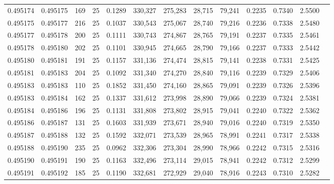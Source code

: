 \begin{tabular}{rrrrrrrrrrrrr}
0.495174 & 0.495175 &   169 &  25 &                                     0.1289 & 330,327 & 275,283 &  28,715 &  79,241 & 0.2235 & 0.7340 & 2.5500 \\
0.495175 & 0.495177 &   216 &  25 &                                     0.1037 & 330,543 & 275,067 &  28,740 &  79,216 & 0.2236 & 0.7338 & 2.5480 \\
0.495177 & 0.495178 &   200 &  25 &                                     0.1111 & 330,743 & 274,867 &  28,765 &  79,191 & 0.2237 & 0.7335 & 2.5461 \\
0.495178 & 0.495180 &   202 &  25 &                                     0.1101 & 330,945 & 274,665 &  28,790 &  79,166 & 0.2237 & 0.7333 & 2.5442 \\
0.495180 & 0.495181 &   191 &  25 &                                     0.1157 & 331,136 & 274,474 &  28,815 &  79,141 & 0.2238 & 0.7331 & 2.5425 \\
0.495181 & 0.495183 &   204 &  25 &                                     0.1092 & 331,340 & 274,270 &  28,840 &  79,116 & 0.2239 & 0.7329 & 2.5406 \\
0.495183 & 0.495183 &   110 &  25 &                                     0.1852 & 331,450 & 274,160 &  28,865 &  79,091 & 0.2239 & 0.7326 & 2.5396 \\
0.495183 & 0.495184 &   162 &  25 &                                     0.1337 & 331,612 & 273,998 &  28,890 &  79,066 & 0.2239 & 0.7324 & 2.5381 \\
0.495184 & 0.495186 &   196 &  25 &                                     0.1131 & 331,808 & 273,802 &  28,915 &  79,041 & 0.2240 & 0.7322 & 2.5362 \\
0.495186 & 0.495187 &   131 &  25 &                                     0.1603 & 331,939 & 273,671 &  28,940 &  79,016 & 0.2240 & 0.7319 & 2.5350 \\
0.495187 & 0.495188 &   132 &  25 &                                     0.1592 & 332,071 & 273,539 &  28,965 &  78,991 & 0.2241 & 0.7317 & 2.5338 \\
0.495188 & 0.495190 &   235 &  25 &                                     0.0962 & 332,306 & 273,304 &  28,990 &  78,966 & 0.2242 & 0.7315 & 2.5316 \\
0.495190 & 0.495191 &   190 &  25 &                                     0.1163 & 332,496 & 273,114 &  29,015 &  78,941 & 0.2242 & 0.7312 & 2.5299 \\
0.495191 & 0.495192 &   185 &  25 &                                     0.1190 & 332,681 & 272,929 &  29,040 &  78,916 & 0.2243 & 0.7310 & 2.5282 \\

\end{tabular}
